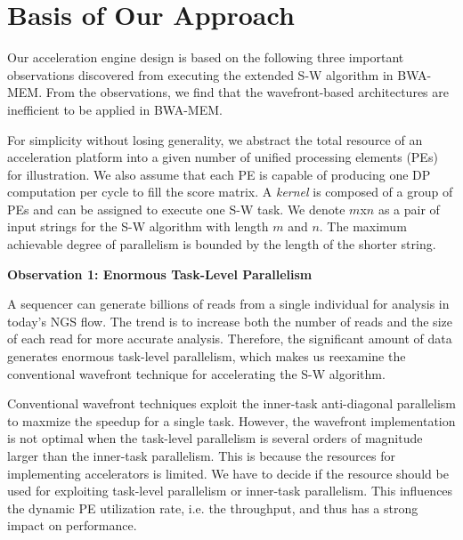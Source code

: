 \section{Basis of Our Approach}
\label{sec:approach}

Our acceleration engine design is based on the following three important observations 
discovered from executing the extended S-W algorithm in BWA-MEM.
From the observations, we find that the wavefront-based architectures are inefficient to be applied in BWA-MEM.

For simplicity without losing generality, 
we abstract the total resource of an acceleration platform into a given number of unified processing elements (PEs) for illustration. 
We also assume that each PE is capable of producing one DP computation per cycle to fill the score matrix. 
A \textit{kernel} is composed of a group of PEs and can be assigned to execute one S-W task.
We denote $m$x$n$ as a pair of input strings for the S-W algorithm with length $m$ and $n$. 
The maximum achievable degree of parallelism is bounded by the length of the shorter string.

\vspace{1pt}
\textbf{Observation 1: Enormous Task-Level Parallelism}
\vspace{1pt}

A sequencer can generate billions of reads from a single individual for analysis in today's NGS flow.
The trend is to increase both the number of reads and the size of each read for more accurate analysis.
Therefore, the significant amount of data generates enormous task-level parallelism, 
which makes us reexamine the conventional wavefront technique for accelerating the S-W algorithm.

Conventional wavefront techniques exploit the inner-task anti-diagonal parallelism to maxmize the speedup for a single task.
However, the wavefront implementation is not optimal when the task-level parallelism is several orders of magnitude larger than the inner-task parallelism.
This is because the resources for implementing accelerators is limited.
We have to decide if the resource should be used for exploiting task-level parallelism or inner-task parallelism.
This influences the dynamic PE utilization rate, i.e. the throughput, and thus has a strong impact on performance.

